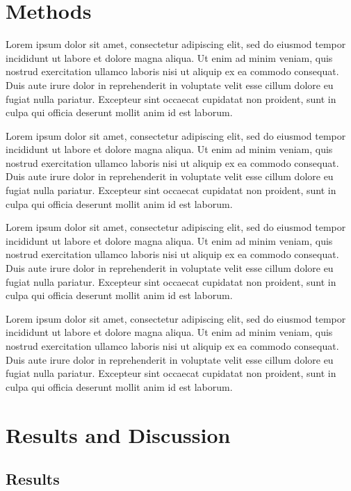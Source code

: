 \section*{Methods}
\label{sec:orgf129c9b}

Lorem ipsum dolor sit amet, consectetur adipiscing elit, sed do eiusmod tempor incididunt ut labore et dolore magna aliqua. Ut enim ad minim veniam, quis nostrud exercitation ullamco laboris nisi ut aliquip ex ea commodo consequat. Duis aute irure dolor in reprehenderit in voluptate velit esse cillum dolore eu fugiat nulla pariatur. Excepteur sint occaecat cupidatat non proident, sunt in culpa qui officia deserunt mollit anim id est laborum.

Lorem ipsum dolor sit amet, consectetur adipiscing elit, sed do eiusmod tempor incididunt ut labore et dolore magna aliqua. Ut enim ad minim veniam, quis nostrud exercitation ullamco laboris nisi ut aliquip ex ea commodo consequat. Duis aute irure dolor in reprehenderit in voluptate velit esse cillum dolore eu fugiat nulla pariatur. Excepteur sint occaecat cupidatat non proident, sunt in culpa qui officia deserunt mollit anim id est laborum.

Lorem ipsum dolor sit amet, consectetur adipiscing elit, sed do eiusmod tempor incididunt ut labore et dolore magna aliqua. Ut enim ad minim veniam, quis nostrud exercitation ullamco laboris nisi ut aliquip ex ea commodo consequat. Duis aute irure dolor in reprehenderit in voluptate velit esse cillum dolore eu fugiat nulla pariatur. Excepteur sint occaecat cupidatat non proident, sunt in culpa qui officia deserunt mollit anim id est laborum.

Lorem ipsum dolor sit amet, consectetur adipiscing elit, sed do eiusmod tempor incididunt ut labore et dolore magna aliqua. Ut enim ad minim veniam, quis nostrud exercitation ullamco laboris nisi ut aliquip ex ea commodo consequat. Duis aute irure dolor in reprehenderit in voluptate velit esse cillum dolore eu fugiat nulla pariatur. Excepteur sint occaecat cupidatat non proident, sunt in culpa qui officia deserunt mollit anim id est laborum.

\section*{Results and Discussion}
\label{sec:orge03aae6}

\subsection*{Results}
\label{sec:orga06def2}

